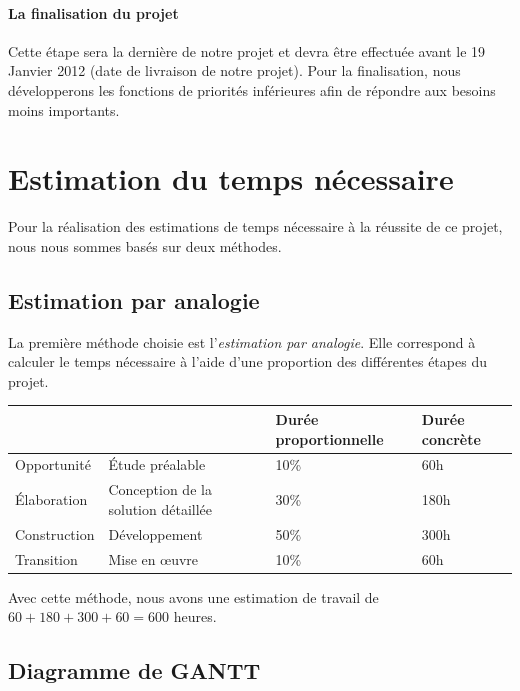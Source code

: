 \paragraph{La finalisation du projet}

Cette étape sera la dernière de notre projet et devra être effectuée avant le 19 Janvier 2012 (date de livraison de notre projet).
Pour la finalisation, nous développerons les fonctions de priorités inférieures afin de répondre aux besoins moins importants. 

\section{Estimation du temps nécessaire}

Pour la réalisation des estimations de temps nécessaire à la réussite de ce projet, nous nous sommes basés sur deux méthodes.

\subsection{Estimation par analogie}

La première méthode choisie est l'\emph{estimation par analogie}.
Elle correspond à calculer le temps nécessaire à l'aide d'une proportion des différentes étapes du projet.  

\begin{tabular}{|l l|l|l|}
\hline
&& Durée proportionnelle & Durée concrète \\
\hline
Opportunité & Étude préalable & 10\% & 60h \\
\hline
Élaboration & Conception de la solution détaillée & 30\% & 180h \\
\hline
Construction & Développement & 50\% & 300h \\
\hline
Transition & Mise en œuvre & 10\% & 60h \\
\hline
\end{tabular}

Avec cette méthode, nous avons une estimation de travail de $60 + 180 + 300 + 60 = 600$ heures. 

\subsection{Diagramme de GANTT}

